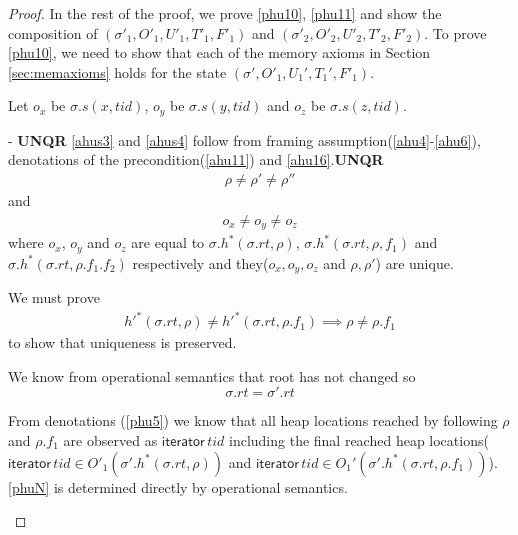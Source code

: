 \begin{proof}
In the rest of the proof, we prove \ref{phu10}, \ref{phu11} and show the composition of $(\sigma'_1, O'_1, U'_1,T'_1,F'_1)$ and  $(\sigma'_2, O'_2, U'_2,T'_2,F'_2)$. To prove \ref{phu10}, we need to show that each of the memory axioms in Section \ref{sec:memaxioms} holds for the state $(\sigma',O'_1,U_1',T_1',F'_1)$.

Let $o_x$ be $\sigma.s(x,tid)$, $o_y$ be $\sigma.s(y,tid)$ and $o_z$ be $\sigma.s(z,tid)$.
\begin{case}\label{unqr} - \textbf{UNQR} \ref{ahus3} and \ref{ahus4} follow from framing assumption(\ref{ahu4}-\ref{ahu6}), denotations of the precondition(\ref{ahu11}) and \ref{ahu16}.\textbf{UNQR}
  \begin{gather}\label{ahus3}
    \rho \neq \rho' \neq \rho'' 
  \end{gather}
and   
  \begin{gather}\label{ahus4}
    o_x \neq o_y \neq o_z 
  \end{gather}
  where $o_x$, $o_y$ and $o_z$ are equal to $\sigma.h^{*}(\sigma.rt,\rho)$, $\sigma.h^{*}(\sigma.rt,\rho,f_1)$ and $\sigma.h^{*}(\sigma.rt,\rho.f_1.f_2)$ respectively and they($o_x,o_y,o_z$ and $\rho,\rho'$) are unique.

We must prove 
\begin{gather}\label{phuc1}
     h'^{*}(\sigma.rt,\rho) \neq h'^{*}(\sigma.rt, \rho.f_1)  \implies \rho \neq \rho.f_1 
\end{gather}
to show that uniqueness is preserved.

We know from operational semantics that root has not changed so
\[\sigma.rt = \sigma'.rt\]

From denotations (\ref{phu5}) we know that all heap locations reached by following $\rho$ and $\rho.f_1$ are observed as $\textsf{iterator}\, tid$ including the final reached heap locations($\textsf{iterator}\,tid \in O'_1(\sigma'.h^{*}(\sigma.rt,\rho))$ and $\textsf{iterator}\,tid \in O_1'(\sigma'.h^{*}(\sigma.rt,\rho.f_1))$). \ref{phuN} is determined directly by operational semantics.


\end{case}
\end{proof}
